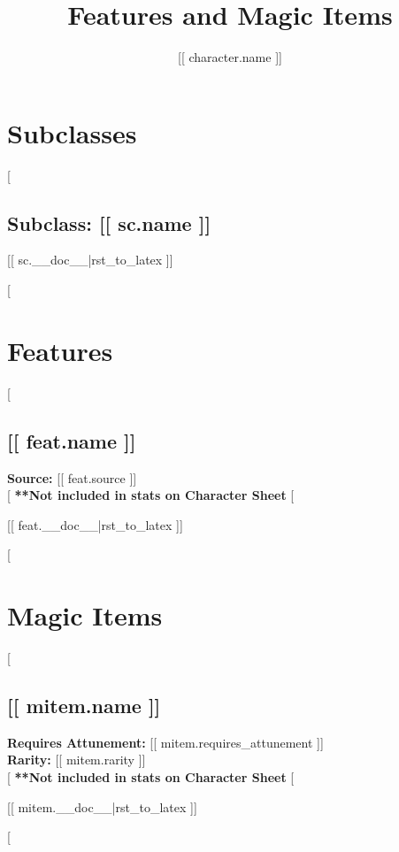 \documentclass[twocolumn,lettersize]{article}
\title{Features and Magic Items}
\author{[[ character.name ]]}
\date{}
\begin{document}
\maketitle

\section*{Subclasses}
           
[%

  \subsection*{Subclass: [[ sc.name ]]}

  [[ sc.__doc__|rst_to_latex ]]

[%
  
\section*{Features}

[%

  \subsection*{[[ feat.name ]]}

  \noindent
  \textbf{Source:} [[ feat.source ]] \\

  [%
    \textbf{**Not included in stats on Character Sheet} %
  [%
             
  [[ feat.__doc__|rst_to_latex ]]

[%

\section*{Magic Items}

[%

  \subsection*{[[ mitem.name ]]}

  \noindent
  \textbf{Requires Attunement:} [[ mitem.requires_attunement ]] \\
  \textbf{Rarity:} [[ mitem.rarity ]] \\

  [%
    \textbf{**Not included in stats on Character Sheet} %
  [%
             
  [[ mitem.__doc__|rst_to_latex ]]

  [%
    
\end{document}
